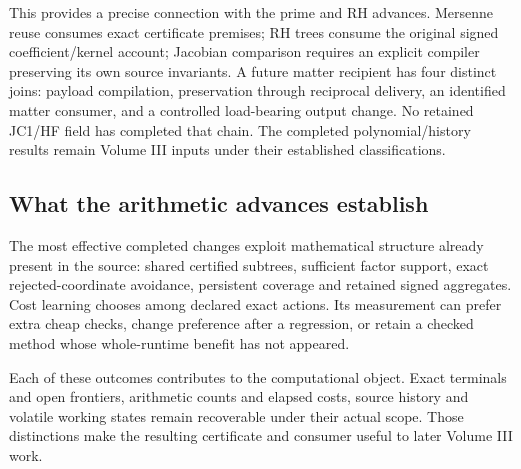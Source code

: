 This provides a precise connection with the prime
and RH advances. Mersenne reuse consumes exact
certificate premises; RH trees consume the original
signed coefficient/kernel account; Jacobian
comparison requires an explicit compiler preserving
its own source invariants. A future matter recipient
has four distinct joins: payload compilation,
preservation through reciprocal delivery, an
identified matter consumer, and a controlled
load-bearing output change. No retained JC1/HF
field has completed that chain. The completed
polynomial/history results remain Volume III
inputs under their established classifications.

\subsection{What the arithmetic advances establish}

The most effective completed changes exploit
mathematical structure already present in the
source: shared certified subtrees, sufficient
factor support, exact rejected-coordinate
avoidance, persistent coverage and retained
signed aggregates. Cost learning chooses among
declared exact actions. Its measurement can
prefer extra cheap checks, change preference
after a regression, or retain a checked method
whose whole-runtime benefit has not appeared.

Each of these outcomes contributes to the
computational object. Exact terminals and open
frontiers, arithmetic counts and elapsed costs,
source history and volatile working states
remain recoverable under their actual scope.
Those distinctions make the resulting
certificate and consumer useful to later
Volume III work.
